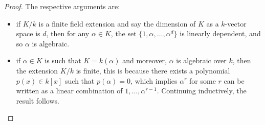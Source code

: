 \documentclass[12pt]{article}
\theoremstyle{plain}
\theoremstyle{definition}
\begin{document}
\begin{proof} The respective arguments are:
\begin{itemize}
    \item if $K/k$ is a finite field extension and say the dimension of $K$ as a $k$-vector space is $d$, then for any $\alpha \in K$, the set $\lbrace 1, \alpha, \hdots, \alpha^d\rbrace$ is linearly dependent, and so $\alpha$ is algebraic.
    \item if $\alpha \in K$ is such that $K = k(\alpha)$ and moreover, $\alpha$ is algebraic over $k$, then the extension $K/k$ is finite, this is because there exists a polynomial $p(x) \in k[x]$ such that $p(\alpha) = 0$, which implies $\alpha^r$ for some $r$ can be written as a linear combination of $1,...,\alpha^{r-1}$. Continuing inductively, the result follows.
\end{itemize}
\end{proof}
\end{document}
